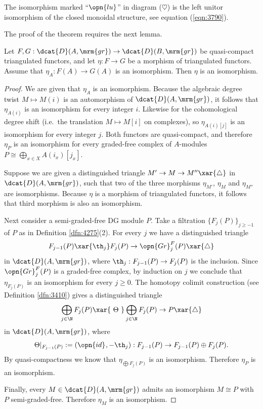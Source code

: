 The isomorphism marked ``$\opn{lu}$'' in diagram ($\heartsuit$) is the left 
unitor isomorphism of the closed monoidal structure, see equation 
(\ref{eqn:3790}). 

The proof of the theorem requires the next lemma.

\begin{lem} \label{lem:3905}
Let 
$F, G : \dcat{D}(A, \mrm{gr}) \to \dcat{D}(B, \mrm{gr})$
be quasi-compact triangulated functors, and let $\eta : F \to G$
be a morphism of triangulated functors. Assume that
$\eta_A : F (A) \to G (A)$
is an isomorphism. Then $\eta$ is an isomorphism. 
\end{lem}

\begin{proof}
We are given that $\eta_A$ is an isomorphism. Because the algebraic degree 
twist $M \mapsto M(i)$ is an automorphism of $\dcat{D}(A, \mrm{gr})$,
it follows that $\eta_{A(i)}$ is an isomorphism for every integer $i$.
Likewise for the cohomological degree shift (i.e.\ the translation 
$M \mapsto M[i]$ on complexes), so $\eta_{A(i)[j]}$ is an isomorphism for every 
integer $j$. Both functors are quasi-compact, and therefore 
$\eta_P$ is an isomorphism for every graded-free complex of $A$-modules 
$P \cong \bigoplus_{x \in X} A(i_x)[j_x]$. 

Suppose we are given a distinguished triangle
$M' \to M \to M'' \xar{\triangle}$
in $\dcat{D}(A, \mrm{gr})$, such that two of the three morphisms 
$\eta_{M'}$, $\eta_{M}$ and $\eta_{M''}$ are isomorphisms. Because $\eta$ is a 
morphism of triangulated functors, it follows that third morphism is
also an isomorphism. 

Next consider a semi-graded-free DG module $P$. Take a filtration \lb 
$\{ F_j(P) \}_{j \geq -1}$ of $P$ as in Definition \ref{dfn:4275}(2).
For every $j$ we have a distinguished triangle
\[ F_{j - 1}(P) \xar{\th_j} F_j(P) \to \opn{Gr}^F_j(P) \xar{\triangle} \]
in $\dcat{D}(A, \mrm{gr})$, where 
$\th_j : F_{j - 1}(P) \to F_j(P)$ is the inclusion. 
Since $\opn{Gr}^F_j(P)$ is a graded-free complex, by
induction on $j$ we conclude that $\eta_{F_j(P)}$ is an isomorphism for every 
$j \geq 0$. The homotopy colimit construction
(see Definition \ref{dfn:3410})
gives a distinguished triangle
\[ \bigoplus_{j \in \N} F_j(P) \xar{\ \Theta \ } \bigoplus_{j \in \N} F_j(P) 
\to P \xar{\triangle} \]
in $\dcat{D}(A, \mrm{gr})$, where 
\[ \Theta|_{F_{j - 1}(P)} := 
(\opn{id}_{}, - \th_j) : F_{j - 1}(P) \to F_{j - 1}(P) \oplus F_{j}(P) . \]
By quasi-compactness we know that 
$\eta_{\bigoplus F_j(P)}$ is an isomorphism. Therefore $\eta_P$ 
is an isomorphism. 

Finally, every $M \in \dcat{D}(A, \mrm{gr})$ admits an  
isomorphism $M \cong P$ with $P$ semi-graded-free. Therefore $\eta_M$ is an 
isomorphism.
\end{proof}

